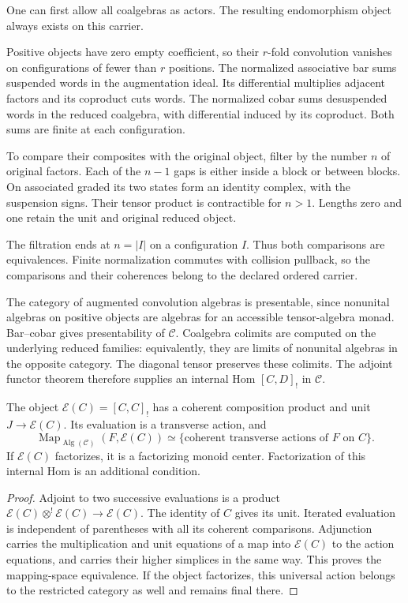 One can first allow all coalgebras as actors. The resulting
endomorphism object always exists on this carrier. 

Positive
objects have zero empty coefficient, so their $r$-fold
convolution vanishes on configurations of fewer than $r$
positions. The normalized associative bar sums suspended
words in the augmentation ideal. Its differential multiplies
adjacent factors and its coproduct cuts words. The normalized
cobar sums desuspended words in the reduced coalgebra, with
differential induced by its coproduct. Both sums are finite
at each configuration.

To compare their composites with the original object,
filter by the number $n$ of original factors. Each of the
$n-1$ gaps is either inside a block or between blocks.
On associated graded its two states form an identity
complex, with the suspension signs. Their tensor product
is contractible for $n>1$. Lengths zero and one retain the
unit and original reduced object. 

The filtration ends at
$n=|I|$ on a configuration $I$. Thus both comparisons are
equivalences. Finite normalization commutes with collision
pullback, so the comparisons and their coherences belong
to the declared ordered carrier.

The category of augmented convolution algebras is
presentable, since nonunital algebras on positive objects
are algebras for an accessible tensor-algebra monad.
Bar--cobar gives presentability of $\mathcal C$. Coalgebra
colimits are computed on the underlying reduced families:
equivalently, they are limits of nonunital algebras in the
opposite category. The diagonal tensor preserves these
colimits. The adjoint functor theorem therefore supplies
an internal Hom $[C,D]_!$ in $\mathcal C$.

\begin{proposition}\label{mht:prop:ambient-actor}
The object $\mathcal E(C)=[C,C]_!$ has a coherent
composition product and unit $J\to\mathcal E(C)$.
Its evaluation is a transverse action, and
\[
 \operatorname{Map}_{\operatorname{Alg}(\mathcal C)}
                        (F,\mathcal E(C))
 \simeq\{\text{coherent transverse actions of }F\text{ on }C\}.
\]
If $\mathcal E(C)$ factorizes, it is a factorizing monoid
center. Factorization of this internal Hom is an additional
condition.
\end{proposition}

\begin{proof}
Adjoint to two successive evaluations is a product
$\mathcal E(C)\otimes^!\mathcal E(C)\to\mathcal E(C)$.
The identity of $C$ gives its unit. Iterated evaluation is
independent of parentheses with all its coherent
comparisons. Adjunction carries the multiplication and
unit equations of a map into $\mathcal E(C)$ to the action
equations, and carries their higher simplices in the same
way. This proves the mapping-space equivalence. If the
object factorizes, this universal action belongs to the
restricted category as well and remains final there.
\end{proof}

